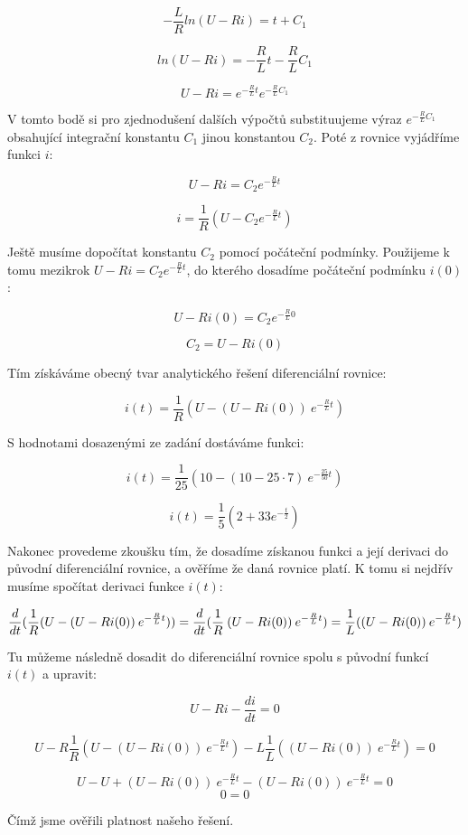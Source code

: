 $$ -\frac{L}{R} ln(U - Ri) = t + C_1 $$

$$ ln(U - Ri) = -\frac{R}{L}t -\frac{R}{L}C_1 $$

$$ U - Ri = e^{-\frac{R}{L}t} e^{-\frac{R}{L}C_1} $$

V tomto bodě si pro zjednodušení dalších výpočtů substituujeme výraz $e^{-\frac{R}{L}C_1}$ obsahující integrační konstantu $C_1$ jinou konstantou $C_2$. Poté z rovnice vyjádříme funkci $i$:

$$ U - Ri = C_2 e^{-\frac{R}{L}t} $$

$$ i = \frac{1}{R} (U - C_2 e^{-\frac{R}{L}t}) $$

Ještě musíme dopočítat konstantu $C_2$ pomocí počáteční podmínky. Použijeme k tomu mezikrok $U - Ri = C_2 e^{-\frac{R}{L}t}$, do kterého dosadíme počáteční podmínku $i(0)$:

$$ U - Ri(0) = C_2 e^{-\frac{R}{L}0} $$

$$ C_2 = U - Ri(0) $$

Tím získáváme obecný tvar analytického řešení diferenciální rovnice:

$$ i(t) = \frac{1}{R} (U - (U - Ri(0)) \: e^{-\frac{R}{L}t}) $$

S hodnotami dosazenými ze zadání dostáváme funkci:

$$ i(t) = \frac{1}{25}(10 - (10 - 25 \cdot 7) \: e^{-\frac{25}{50}t}) $$

$$ i(t) = \frac{1}{5}(2 + 33 e^{-\frac{t}{2}}) $$

Nakonec provedeme zkoušku tím, že dosadíme získanou funkci a její derivaci do původní diferenciální rovnice, a ověříme že daná rovnice platí. K tomu si nejdřív musíme spočítat derivaci funkce $i(t)$:

$$ \frac{d}{dt} (\frac{1}{R} (U - (U - Ri(0)) \: e^{-\frac{R}{L}t})) = \\
\frac{d}{dt} (\frac{1}{R} \: (U - Ri(0)) \: e^{-\frac{R}{L}t}) = \\
\frac{1}{L} ((U - Ri(0)) \: e^{-\frac{R}{L}t}) $$

Tu můžeme následně dosadit do diferenciální rovnice spolu s původní funkcí $i(t)$ a upravit:

$$ U - Ri - \frac{di}{dt} = 0 $$

$$ U - R \frac{1}{R} (U - (U - Ri(0)) \: e^{-\frac{R}{L}t}) - L \frac{1}{L} ((U - Ri(0)) \: e^{-\frac{R}{L}t}) = 0$$

$$ U - U + (U - Ri(0)) \: e^{-\frac{R}{L}t} - (U - Ri(0)) \: e^{-\frac{R}{L}t} = 0 $$
$$ 0 = 0 $$

Čímž jsme ověřili platnost našeho řešení.
